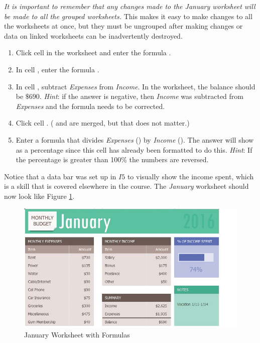 \textit{It is important to remember that any changes made to the January worksheet will be made to all the grouped worksheets.} This makes it easy to make changes to all the worksheets at once, but they must be ungrouped after making changes or data on linked worksheets can be inadvertently destroyed. 

\begin{enumbox}
	\begin{enumerate}
		\item Click cell  in the  worksheet and enter the formula .
		\item In cell , enter the formula .
		\item In cell , subtract \textit{Expenses} from \textit{Income}. In the  worksheet, the balance should be $ \$690 $. \textit{Hint}: if the answer is negative, then \textit{Income} was subtracted from \textit{Expenses} and the formula needs to be corrected.
		\item Click cell . ( and  are merged, but that does not matter.)
		\item Enter a formula that divides \textit{Expenses} () by \textit{Income} (). The answer will show as a percentage since this cell has already been formatted to do this. \textit{Hint}: If the percentage is greater than 100\% the numbers are reversed.
	\end{enumerate}
\end{enumbox}

Notice that a data bar was set up in $ I5 $ to visually show the income spent, which is a skill that is covered elsewhere in the course. The \textit{January} worksheet should now look like Figure \ref{06:fig05}.

\begin{figure}[H]
	\centering
	\includegraphics[width=\maxwidth{.95\linewidth}]{gfx/ch06_fig05}
	\caption{January Worksheet with Formulas}
	\label{06:fig05}
\end{figure}

